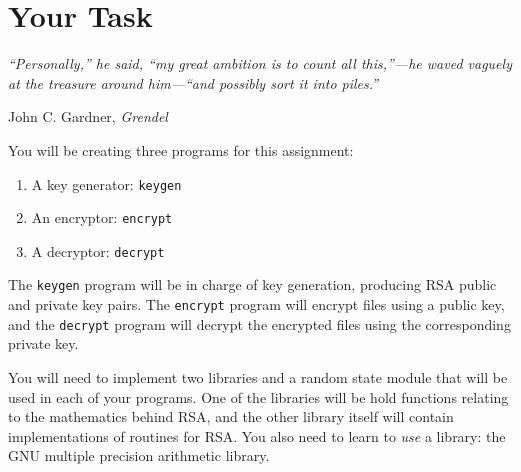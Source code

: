 \section{Your Task}
\epigraph{\emph{``Personally,'' he said, ``my great ambition is to count all this,''---he waved
vaguely at the treasure around him---``and possibly sort it into piles.''}}{John C.\xspace Gardner, \emph{Grendel}}

\noindent You will be creating three programs for this assignment:
\begin{enumerate}
  \item A key generator: \texttt{keygen}
  \item An encryptor: \texttt{encrypt}
  \item A decryptor: \texttt{decrypt}
\end{enumerate}

The \texttt{keygen} program will be in charge of key generation,
producing RSA public and private key pairs. The \texttt{encrypt} program
will encrypt files using a public key, and the \texttt{decrypt} program
will decrypt the encrypted files using the corresponding private key.

You will need to implement two libraries and a random state module that
will be used in each of your programs. One of the libraries will be hold
functions relating to the mathematics behind RSA, and the other library
itself will contain implementations of routines for RSA\@. You also need
to learn to \emph{use} a library: the GNU multiple precision arithmetic
library.
